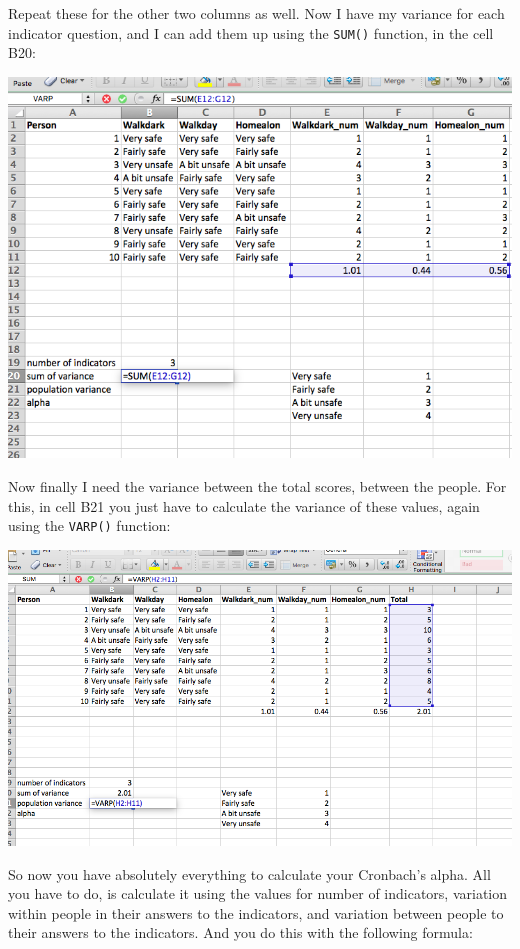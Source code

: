\documentclass[
]{book}
\begin{document}
Repeat these for the other two columns as well. Now I have my variance for each indicator question, and I can add them up using the \texttt{SUM()} function, in the cell B20:

\includegraphics{imgs/sum_var_alpha.png}

Now finally I need the variance between the total scores, between the people. For this, in cell B21 you just have to calculate the variance of these values, again using the \texttt{VARP()} function:

\includegraphics{imgs/pop_var_alpha.png}

So now you have absolutely everything to calculate your Cronbach's alpha. All you have to do, is calculate it using the values for number of indicators, variation within people in their answers to the indicators, and variation between people to their answers to the indicators. And you do this with the following formula:
\end{document}
